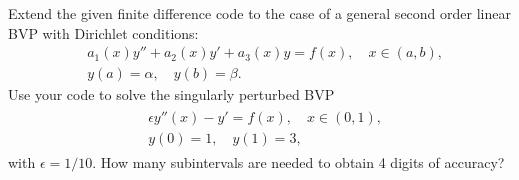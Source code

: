 % 



\begin{problem}
Extend the given finite difference code to the case of a general second order linear BVP with Dirichlet conditions:
\begin{align*}
	&{ } a_1(x)y'' +a_2(x)y'+ a_3(x) y = f(x), \quad x \in (a,b),\\
	&{ } y(a) = \alpha, \quad y(b) = \beta.
\end{align*}
Use your code to solve the singularly perturbed BVP
\begin{align}
	\begin{split}
	&{ } \epsilon y''(x)-y'= f(x), \quad x \in (0,1), \\
	&{ } y(0) = 1, \quad y(1) = 3,
	\end{split} \label{fd:singular_perturbed_BVP}
\end{align}
with $\epsilon = 1/10$. How many subintervals are needed to obtain 4 digits of accuracy? 

\end{problem}

